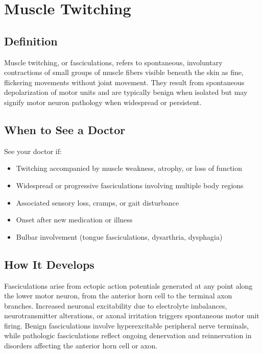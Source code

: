 \chapter{Muscle Twitching}

\section*{Definition}
Muscle twitching, or fasciculations, refers to spontaneous, involuntary contractions of small groups of muscle fibers visible beneath the skin as fine, flickering movements without joint movement. They result from spontaneous depolarization of motor units and are typically benign when isolated but may signify motor neuron pathology when widespread or persistent.

\section*{When to See a Doctor}
See your doctor if:
\begin{itemize}
  \item Twitching accompanied by muscle weakness, atrophy, or loss of function
  \item Widespread or progressive fasciculations involving multiple body regions
  \item Associated sensory loss, cramps, or gait disturbance
  \item Onset after new medication or illness
  \item Bulbar involvement (tongue fasciculations, dysarthria, dysphagia)
\end{itemize}

\section*{How It Develops}
Fasciculations arise from ectopic action potentials generated at any point along the lower motor neuron, from the anterior horn cell to the terminal axon branches. Increased neuronal excitability due to electrolyte imbalances, neurotransmitter alterations, or axonal irritation triggers spontaneous motor unit firing. Benign fasciculations involve hyperexcitable peripheral nerve terminals, while pathologic fasciculations reflect ongoing denervation and reinnervation in disorders affecting the anterior horn cell or axon.

